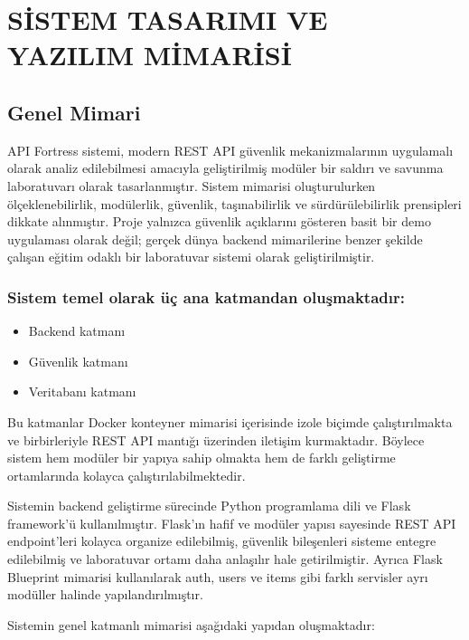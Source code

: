 \section{SİSTEM TASARIMI VE YAZILIM MİMARİSİ}
\label{bolum5}

\subsection{Genel Mimari}
\label{genel-mimari}

API Fortress sistemi, modern REST API güvenlik mekanizmalarının uygulamalı olarak analiz edilebilmesi amacıyla geliştirilmiş modüler bir saldırı ve savunma laboratuvarı olarak tasarlanmıştır. Sistem mimarisi oluşturulurken ölçeklenebilirlik, modülerlik, güvenlik, taşınabilirlik ve sürdürülebilirlik prensipleri dikkate alınmıştır. Proje yalnızca güvenlik açıklarını gösteren basit bir demo uygulaması olarak değil; gerçek dünya backend mimarilerine benzer şekilde çalışan eğitim odaklı bir laboratuvar sistemi olarak geliştirilmiştir.

\subsubsection{Sistem temel olarak üç ana katmandan oluşmaktadır:}

\begin{itemize}[leftmargin=*]
    \item Backend katmanı
    \item Güvenlik katmanı
    \item Veritabanı katmanı
\end{itemize}

Bu katmanlar Docker konteyner mimarisi içerisinde izole biçimde çalıştırılmakta ve birbirleriyle REST API mantığı üzerinden iletişim kurmaktadır. Böylece sistem hem modüler bir yapıya sahip olmakta hem de farklı geliştirme ortamlarında kolayca çalıştırılabilmektedir.

Sistemin backend geliştirme sürecinde Python programlama dili ve Flask framework’ü kullanılmıştır. Flask’ın hafif ve modüler yapısı sayesinde REST API endpoint’leri kolayca organize edilebilmiş, güvenlik bileşenleri sisteme entegre edilebilmiş ve laboratuvar ortamı daha anlaşılır hale getirilmiştir. Ayrıca Flask Blueprint mimarisi kullanılarak auth, users ve items gibi farklı servisler ayrı modüller halinde yapılandırılmıştır.

Sistemin genel katmanlı mimarisi aşağıdaki yapıdan oluşmaktadır:

